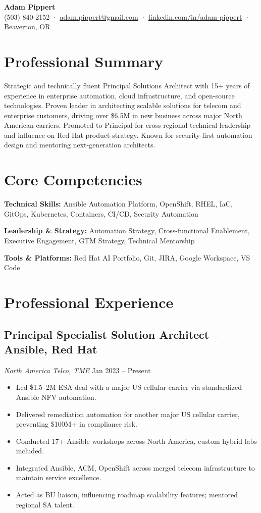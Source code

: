 \documentclass[11pt]{article}
\begin{document}
\begin{center}
    \textbf{\LARGE Adam Pippert} \\
    (503) 840-2152 · \href{mailto:adam.pippert@gmail.com}{adam.pippert@gmail.com} · 
    \href{https://www.linkedin.com/in/adam-pippert}{linkedin.com/in/adam-pippert} · Beaverton, OR
\end{center}

\section*{Professional Summary}
Strategic and technically fluent Principal Solutions Architect with 15+ years of experience in enterprise automation, cloud infrastructure, and open-source technologies. Proven leader in architecting scalable solutions for telecom and enterprise customers, driving over \$6.5M in new business across major North American carriers. Promoted to Principal for cross-regional technical leadership and influence on Red Hat product strategy. Known for security-first automation design and mentoring next-generation architects.

\section*{Core Competencies}
\textbf{Technical Skills:} Ansible Automation Platform, OpenShift, RHEL, IaC, GitOps, Kubernetes, Containers, CI/CD, Security Automation

\textbf{Leadership \& Strategy:} Automation Strategy, Cross-functional Enablement, Executive Engagement, GTM Strategy, Technical Mentorship

\textbf{Tools \& Platforms:} Red Hat AI Portfolio, Git, JIRA, Google Workspace, VS Code

\section*{Professional Experience}

\subsection{Principal Specialist Solution Architect – Ansible, Red Hat}
\textit{North America Telco, TME} \hfill Jan 2023 – Present
\begin{itemize}[leftmargin=*]
    \item Led \$1.5–2M ESA deal with a major US cellular carrier via standardized Ansible NFV automation.
    \item Delivered remediation automation for another major US cellular carrier, preventing \$100M+ in compliance risk.
    \item Conducted 17+ Ansible workshops across North America, custom hybrid labs included.
    \item Integrated Ansible, ACM, OpenShift across merged telecom infrastructure to maintain service excellence.
    \item Acted as BU liaison, influencing roadmap scalability features; mentored regional SA talent.
\end{itemize}
\end{document}
